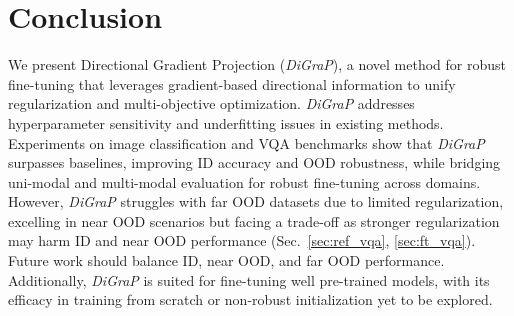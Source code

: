 

\section{Conclusion}

We present Directional Gradient Projection (\emph{DiGraP}), a novel method for robust fine-tuning that leverages gradient-based directional information to unify regularization and multi-objective optimization. \emph{DiGraP} addresses hyperparameter sensitivity and underfitting issues in existing methods. Experiments on image classification and VQA benchmarks show that \emph{DiGraP} surpasses baselines, improving ID accuracy and OOD robustness, while bridging uni-modal and multi-modal evaluation for robust fine-tuning across domains. 
However, \emph{DiGraP} struggles with far OOD datasets due to limited regularization, excelling in near OOD scenarios but facing a trade-off as stronger regularization may harm ID and near OOD performance (Sec.~\ref{sec:ref_vqa}, \ref{sec:ft_vqa}). Future work should balance ID, near OOD, and far OOD performance. Additionally, \emph{DiGraP} is suited for fine-tuning well pre-trained models, with its efficacy in training from scratch or non-robust initialization yet to be explored.